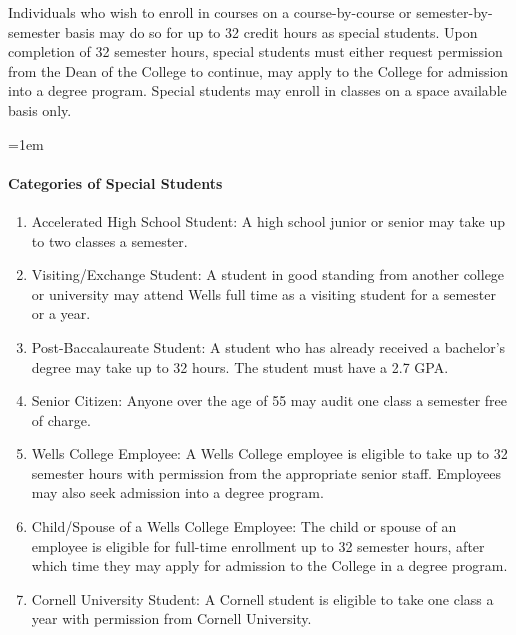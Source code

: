\documentclass{manual}
\newcommand{\oldbreak}[1]{}
\let\oldparagraph\paragraph
\renewcommand\paragraph{\leftskip=1em\oldparagraph}
\newcommand{\itemLevelA}{\alph*.}
\newcommand{\itemRefA}{\alph*}
\begin{document}
Individuals who wish to enroll in courses on a course-by-course or semester-by-semester basis may do so for up to 32 credit hours as special students. Upon completion of 32 semester hours, special students must either request permission from the Dean of the College to continue,  may apply to the College for admission into a degree program. Special students may enroll in classes on a space available basis only.

\paragraph{Categories of Special Students}\label{par:CategoriesOfSpecialStudents}

\begin{enumerate}[label=\itemLevelA,ref=\itemRefA]

\item Accelerated High School Student: A high school junior or senior may take up to two classes a semester.
\item  Visiting/Exchange Student: A student in good standing from another college or university may attend Wells full time as a visiting student for a semester or a year.
\item  Post-Baccalaureate Student: A student who has already received a bachelor's degree may take up to 32 hours. The student must have a 2.7 GPA.
\item Senior Citizen: Anyone over the age of 55 may audit one class a semester free of charge.

\oldbreak{X-1}

\item \label{item:employeeClasses} Wells College Employee: A Wells College employee is eligible to take up to 32 semester hours with permission from the appropriate senior staff. Employees may also seek admission into a degree program.

\item \label{item:spouseClasses} Child/Spouse of a Wells College Employee: The child or spouse of an employee is eligible for full-time enrollment up to 32 semester hours, after which time they may apply for admission to the College in a degree program.

\item Cornell University Student: A Cornell student is eligible to take one class a year with permission from Cornell University.
\end{enumerate}
\end{document}

